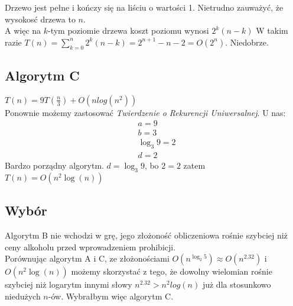 \documentclass{article}
\begin{document}
Drzewo jest pełne i kończy się na liściu o wartości 1. Nietrudno zauważyć, że wysokosć drzewa to $n$.\\
A więc na $k$-tym poziomie drzewa koszt poziomu wynosi $2^k(n-k)$
W takim razie $T(n) = \sum_{k = 0}^{n} 2^k(n-k) = 2^{n+1} - n -2 = O(2^n)$. Niedobrze.

\subsection{Algorytm C}
$T(n) = 9T(\frac{n}{3}) + O(nlog(n^2))$\\

Ponownie możemy zastosować \textit{Twierdzenie o Rekurencji Uniwersalnej}.
U nas: 
\begin{align*}
	&a = 9\\
	&b = 3\\
	&\log_3 9 = 2\\
	&d = 2
\end{align*}
Bardzo porządny algorytm. $d = \log_3 9$, bo $2 = 2$ zatem $T(n) = O(n^2\log(n))$

\subsection{Wybór}
Algorytm B nie wchodzi w grę, jego złożoność obliczeniowa rośnie szybciej niż ceny alkoholu przed wprowadzeniem prohibicji.\\
Porównując algorytm A i C, ze złożonościami $O(n^{\log_2 5}) \approx O(n^{2.32})$ i $O(n^2\log(n))$ możemy skorzystać z tego, że dowolny wielomian rośnie szybciej niż logarytm innymi słowy $n^{2.32} > n^2log(n)$ już dla stosunkowo niedużych $n$-ów. Wybrałbym więc algorytm C.
\end{document}
